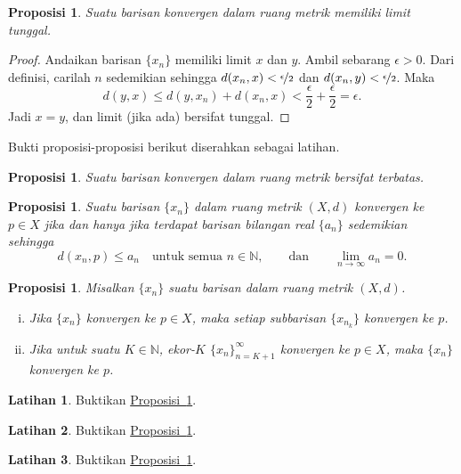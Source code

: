 \documentclass[12pt,openany]{book}
\newcommand{\N}{{\mathbb{N}}}
\theoremstyle{plain}
\newtheorem{prop}[thm]{Proposisi}
\theoremstyle{remark}
\theoremstyle{definition}
\newenvironment{exbox}{%
    \def\FrameCommand{\vrule width 1pt \relax\hspace{10pt}}%
    \MakeFramed{\advance\hsize-\width\FrameRestore}%
}{%
    \endMakeFramed
}
\theoremstyle{exercise}
\newtheorem{exercise}{Latihan}[section]
\theoremstyle{example}
\newcommand{\propref}[1]{\hyperref[#1]{Proposisi~\ref*{#1}}}
\begin{document}
\begin{prop} \label{prop:mslimisunique}
Suatu barisan konvergen dalam ruang metrik memiliki limit tunggal.
\end{prop}

\begin{proof}
Andaikan barisan $\{ x_n \}$ memiliki limit $x$ dan $y$.
Ambil sebarang $\epsilon > 0$.
Dari definisi, carilah $n$ sedemikian sehingga
$d(x_n,x) < \nicefrac{\epsilon}{2}$ dan
$d(x_n,y) < \nicefrac{\epsilon}{2}$. Maka
\begin{equation*}
d(y,x)
\leq
d(y,x_n) + d(x_n,x)
<
\frac{\epsilon}{2} + \frac{\epsilon}{2} = \epsilon .
\end{equation*}
Jadi $x=y$, dan limit (jika ada) bersifat tunggal.
\end{proof}

Bukti proposisi-proposisi berikut diserahkan sebagai latihan.

\begin{prop} \label{prop:msconvbound}
Suatu barisan konvergen dalam ruang metrik bersifat terbatas.
\end{prop}

\begin{prop} \label{prop:msconvifa}
Suatu barisan $\{ x_n \}$ dalam ruang metrik $(X,d)$ konvergen ke $p \in X$
jika dan hanya
jika terdapat barisan bilangan real $\{ a_n \}$ sedemikian sehingga
\begin{equation*}
d(x_n,p) \leq a_n \quad \text{untuk semua } n \in \N,
\qquad \text{dan} \qquad
\lim_{n\to\infty} a_n = 0.
\end{equation*}
\end{prop}

\begin{prop} \label{prop:mssubseq}
Misalkan $\{ x_n \}$ suatu barisan dalam ruang metrik $(X,d)$.
\begin{enumerate}[(i)]
\item Jika $\{ x_n \}$ konvergen ke $p \in X$, maka setiap subbarisan $\{ x_{n_k} \}$
konvergen ke $p$.
\item Jika untuk suatu $K \in \N$, ekor-$K$ $\{ x_n \}_{n=K+1}^\infty$
konvergen ke $p \in X$, maka
 $\{ x_n \}$ konvergen ke $p$.
\end{enumerate}
\end{prop}

\begin{exbox}
\begin{exercise}
Buktikan \propref{prop:msconvbound}.
\end{exercise}

\begin{exercise}
Buktikan \propref{prop:msconvifa}.
\end{exercise}

\begin{exercise}
Buktikan \propref{prop:mssubseq}.
\end{exercise}
\end{exbox}
\end{document}
